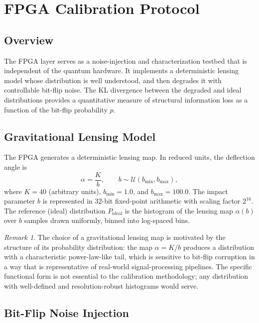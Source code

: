 \documentclass[12pt,a4paper,oneside]{book}
\theoremstyle{plain}
\theoremstyle{definition}
\theoremstyle{remark}
\newtheorem{remark}[theorem]{Remark}
\begin{document}
\section{FPGA Calibration Protocol}
\label{sec:fpga}

\subsection{Overview}

The FPGA layer serves as a noise-injection and characterization testbed that is independent of the quantum hardware. It implements a deterministic lensing model whose distribution is well understood, and then degrades it with controllable bit-flip noise. The KL divergence between the degraded and ideal distributions provides a quantitative measure of structural information loss as a function of the bit-flip probability $p$.

\subsection{Gravitational Lensing Model}

The FPGA generates a deterministic lensing map. In reduced units, the deflection angle is
\begin{equation}
    \label{eq:lensing}
    \alpha = \frac{K}{b}, \qquad b \sim \mathcal{U}(b_{\min}, b_{\max}),
\end{equation}
where $K = 40$ (arbitrary units), $b_{\min} = 1.0$, and $b_{\max} = 100.0$. The impact parameter $b$ is represented in 32-bit fixed-point arithmetic with scaling factor $2^{16}$. The reference (ideal) distribution $P_{\text{ideal}}$ is the histogram of the lensing map $\alpha(b)$ over $b$ samples drawn uniformly, binned into log-spaced bins.

\begin{remark}
The choice of a gravitational lensing map is motivated by the structure of its probability distribution: the map $\alpha = K/b$ produces a distribution with a characteristic power-law-like tail, which is sensitive to bit-flip corruption in a way that is representative of real-world signal-processing pipelines. The specific functional form is not essential to the calibration methodology; any distribution with well-defined and resolution-robust histograms would serve.
\end{remark}

\subsection{Bit-Flip Noise Injection}
\end{document}
